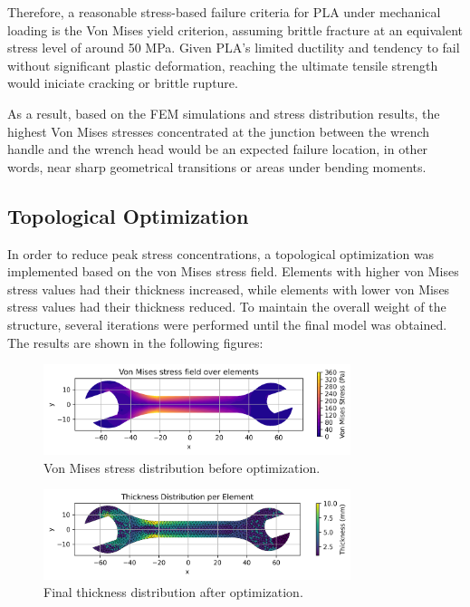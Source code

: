Therefore, a reasonable stress-based failure criteria for PLA under mechanical loading is the Von Mises yield criterion, assuming brittle fracture at an equivalent stress level of around 50 MPa. Given PLA's limited ductility and tendency to fail without significant plastic deformation, reaching the ultimate tensile strength would iniciate cracking or brittle rupture.

As a result, based on the FEM simulations and stress distribution results, the highest Von Mises stresses concentrated at the junction between the wrench handle and the wrench head would be an expected failure location, in other words, near sharp geometrical transitions or areas under bending moments.

\subsection{Topological Optimization}

In order to reduce peak stress concentrations, a topological optimization was implemented based on the von Mises stress field. Elements with higher von Mises stress values had their thickness increased, while elements with lower von Mises stress values had their thickness reduced.  
To maintain the overall weight of the structure, several iterations were performed until the final model was obtained.  
The results are shown in the following figures:

\begin{figure}[H]
    \centering
    \includegraphics[width=0.8\textwidth]{GRAFICOS/Topo_ini_von_mises.png}
    \caption{Von Mises stress distribution before optimization.}
    \label{fig:von_mises_initial}
\end{figure}

\begin{figure}[H]
    \centering
    \includegraphics[width=0.8\textwidth]{GRAFICOS/espesores_espesores.png}
    \caption{Final thickness distribution after optimization.}
    \label{fig:thickness_distribution}
\end{figure}

